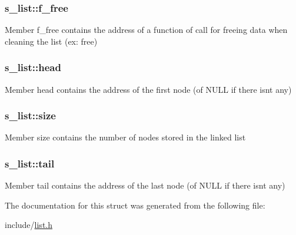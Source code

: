 \subsubsection[{f\+\_\+free}]{\setlength{\rightskip}{0pt plus 5cm}s\+\_\+list\+::f\+\_\+free}\label{structs__list_a6a8f9425515ba8a81adb922221ce2e7d}
Member \textquotesingle{}f\+\_\+free\textquotesingle{} contains the address of a function of call for freeing \textquotesingle{}data\textquotesingle{} when cleaning the list (ex\+: free) \hypertarget{structs__list_af222b43290e12d08dd57530ebc7f672b}{}
\subsubsection[{head}]{\setlength{\rightskip}{0pt plus 5cm}s\+\_\+list\+::head}\label{structs__list_af222b43290e12d08dd57530ebc7f672b}
Member \textquotesingle{}head\textquotesingle{} contains the address of the first node (of N\+U\+L\+L if there isn\textquotesingle{}t any) \hypertarget{structs__list_ac322563dbbb8c1dafd814734cfa689f1}{}
\subsubsection[{size}]{\setlength{\rightskip}{0pt plus 5cm}s\+\_\+list\+::size}\label{structs__list_ac322563dbbb8c1dafd814734cfa689f1}
Member \textquotesingle{}size\textquotesingle{} contains the number of nodes stored in the linked list \hypertarget{structs__list_a34c85ecf7803f11cb86886c9e9967c19}{}
\subsubsection[{tail}]{\setlength{\rightskip}{0pt plus 5cm}s\+\_\+list\+::tail}\label{structs__list_a34c85ecf7803f11cb86886c9e9967c19}
Member \textquotesingle{}tail\textquotesingle{} contains the address of the last node (of N\+U\+L\+L if there isn\textquotesingle{}t any) 

The documentation for this struct was generated from the following file\+:\begin{DoxyCompactItemize}
\item 
include/\hyperlink{list_8h}{list.\+h}\end{DoxyCompactItemize}
